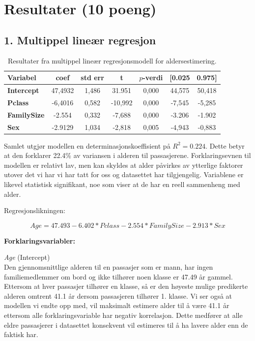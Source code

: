 \newpage
\section{Resultater (10 poeng)}\label{resultater-10-poeng}
\subsection{1. Multippel lineær regresjon}

\begin{table}[h!]
    \centering
    \begin{tabular}{lcccccc}
        \hline
        \textbf{Variabel} & \textbf{coef} & \textbf{std err} & \textbf{t} & \textbf{$p$-verdi} & \textbf{[0.025} & \textbf{0.975]} \\
        \hline
        \textbf{Intercept} & 47,4932 & 1,486 & 31.951 & 0,000 & 44,575 & 50,418 \\
        \textbf{Pclass}    & -6,4016 & 0,582 & -10,992 & 0,000 & -7,545 & -5,285 \\
        \textbf{FamilySize}     & -2.554 & 0,332 & -7,688 & 0,000 & -3.206 & -1.902 \\
        \textbf{Sex}     & -2.9129 & 1,034 & -2,818 & 0,005 & -4,943 & -0,883 \\
        \hline
    \end{tabular}
    \caption{Resultater fra multippel lineær regresjonsmodell for aldersestimering.}
    \label{tab:regresjon_alder}
\end{table}

Samlet utgjør modellen en determinasjonskoeffisient på $R^2 = 0.224$. Dette betyr at den forklarer 22.4\% av variansen i alderen til passasjerene. Forklaringsevnen til modellen er relativt lav, men kan skyldes at alder påvirkes av ytterlige faktorer utover det vi har vi har tatt for oss og datasettet har tilgjengelig.  Variablene er likevel statistisk signifikant, noe som viser at de har en reell sammenheng med alder.

Regresjonslikningen: 

$$\textit{Age} = 47.493 - 6.402*\textit{Pclass}-2.554*FamilySize-2.913*\textit{Sex}$$

\textbf{Forklaringsvariabler:} 

\textit{Age} (Intercept) \\
Den gjennomsnittlige alderen til en passasjer som er mann, har ingen familiemedlemmer om bord og ikke tilhører noen klasse er 47.49 år gammel. Ettersom at hver passasjer tilhører en klasse, så er den høyeste mulige predikerte alderen omtrent 41.1 år dersom passasjeren tilhører 1. klasse.
Vi ser også at modellen vi endte opp med, vil maksimalt estimere alder til å være 41.1 år ettersom alle forklaringsvariable har negativ korrelasjon. Dette medfører at alle eldre passasjerer i datasettet konsekvent vil estimeres til å ha lavere alder enn de faktisk har.

